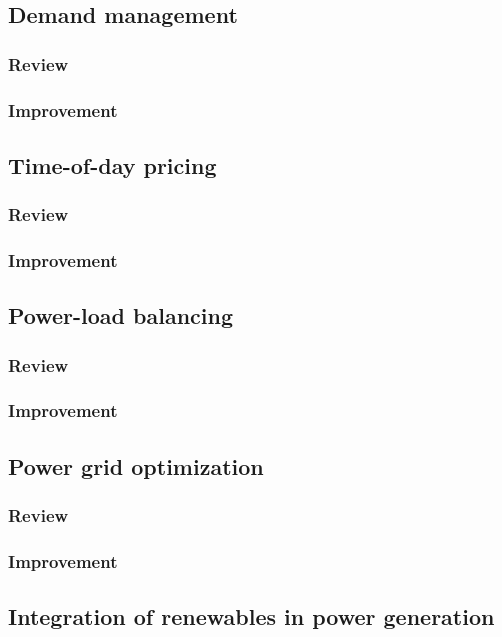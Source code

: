 \documentclass[11pt, twocolumn]{article}
\begin{document}
\subsection{Demand management}
\subsubsection{Review}
\subsubsection{Improvement}

\subsection{Time-of-day pricing}
\subsubsection{Review}
\subsubsection{Improvement}

\subsection{Power-load balancing}
\subsubsection{Review}
\subsubsection{Improvement}

\subsection{Power grid optimization}
\subsubsection{Review}
\subsubsection{Improvement}

\subsection{Integration of renewables in power generation}
\end{document}
